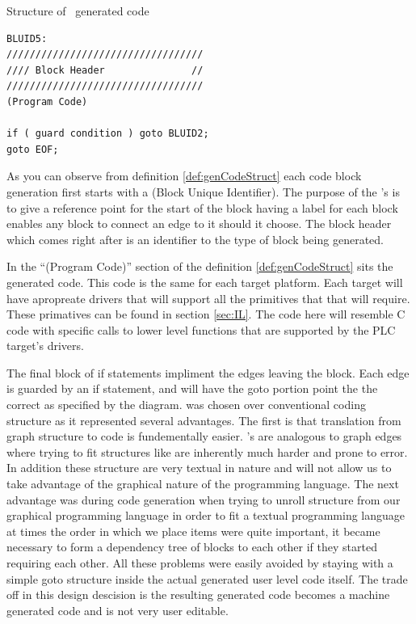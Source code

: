 \noindent\begin{minipage}{\textwidth}
\begin{definition}
\label{def:genCodeStruct}
Structure of \plcchart \  generated code

\begin{lstlisting}[frame=single]
BLUID5:
//////////////////////////////////
//// Block Header               //
//////////////////////////////////
(Program Code)

if ( guard condition ) goto BLUID2;
goto EOF;
\end{lstlisting}
\end{definition}
\end{minipage}

As you can observe from definition \ref{def:genCodeStruct} each code block generation first starts with a  (Block Unique Identifier). The purpose of the 's is to give a reference point for the start of the block having a  label for each block enables any block to connect an edge to it should it choose. The block header which comes right after is an identifier to the type of block being generated. 

In the ``(Program Code)'' section of the definition \ref{def:genCodeStruct} sits the generated  code. This code is the same for each target platform. Each  target will have apropreate drivers that will support all the primitives that that  will require. These primatives can be found in section \ref{sec:IL}. The code here will resemble C code with specific calls to lower level functions that are supported by the PLC target's drivers.

The final block of if statements impliment the edges leaving the block. Each edge is guarded by an if statement, and will have the goto portion point the the correct  as specified by the diagram.  was chosen over conventional coding structure as it represented several advantages. The first is that translation from graph structure to code is fundementally easier. 's are analogous to graph edges where trying to fit structures like   are inherently much harder and prone to error. In addition these structure are very textual in nature and will not allow us to take advantage of the graphical nature of the programming language. The next advantage was during code generation when trying to unroll structure from our graphical programming language in order to fit a textual programming language at times the order in which we place items were quite important, it became necessary to form a dependency tree of blocks to each other if they started requiring each other. All these problems were easily avoided by staying with a simple goto structure inside the actual generated user level  code itself. The trade off in this design descision is the resulting generated code becomes a machine generated code and is not very user editable. 

